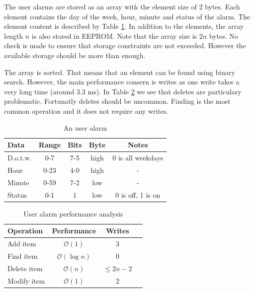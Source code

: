 \documentclass{awac02}
\begin{document}
The user alarms are stored as an array with the element size of 2
bytes. Each element contains the day of the week, hour, minute and status of
the alarm. The element content is described by Table \ref{tab:user-alarm}.  In
addition to the elements, the array length $n$ is also stored in EEPROM. Note
that the array size is $2n$ bytes. No check is made to ensure that storage
constraints are not exceeded. However the available storage should be more than
enough.

The array is sorted. That means that an element can be found using binary
search. However, the main performance consern is writes as one write
takes a very long time (around 3.3 ms). In Table
\ref{tab:user-alarm-performance} we see that deletes are particulary
problematic. Fortunatly deletes should be uncommon. Finding is the most common
operation and it does not require any writes.

\begin{table}[ht]
\centering
\begin{tabular}{| l | c | c | c | c |}
    \hline
    Data & Range & Bits & Byte & Notes\\
    \hline
    D.o.t.w. & 0-7 & 7-5 & high & 0 is all weekdays\\
    Hour & 0-23 & 4-0 & high & -\\
    Minute & 0-59 & 7-2 & low & -\\
    Status & 0-1 & 1 & low & 0 is off, 1 is on\\
    \hline
\end{tabular}
\caption{An user alarm}
\label{tab:user-alarm}
\end{table}

\begin{table}[ht]
\centering
\begin{tabular}{| l | c | c | c |}
    \hline
    Operation & Performance & Writes \\
    \hline
    Add item & $\mathcal{O}(1)$ & $3$ \\
    Find item & $\mathcal{O}(\log n)$ & $0$ \\
    Delete item & $\mathcal{O}(n)$ & $\leq 2n - 2$ \\
    Modify item & $\mathcal{O}(1)$ & $2$ \\
    \hline
\end{tabular}
\caption{User alarm performance analysis}
\label{tab:user-alarm-performance}
\end{table}
\end{document}
